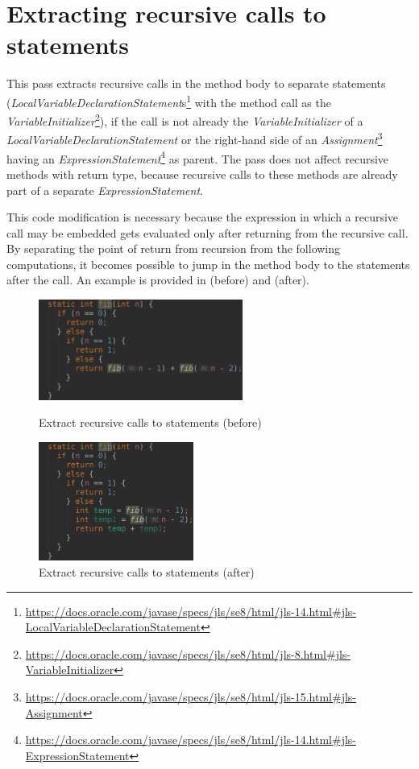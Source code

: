 \section{Extracting recursive calls to statements}

This pass extracts recursive calls in the method body to separate statements
(\textit{LocalVariableDeclarationStatement}s\footnote{\url{https://docs.oracle.com/javase/specs/jls/se8/html/jls-14.html#jls-LocalVariableDeclarationStatement}}
with the method call as the
\textit{VariableInitializer}\footnote{\url{https://docs.oracle.com/javase/specs/jls/se8/html/jls-8.html#jls-VariableInitializer}}),
if the call is not already the \textit{VariableInitializer} of a \textit{LocalVariableDeclarationStatement} or the
right-hand side of an \textit{Assignment}\footnote{\url{https://docs.oracle.com/javase/specs/jls/se8/html/jls-15.html#jls-Assignment}}
having an \textit{ExpressionStatement}\footnote{\url{https://docs.oracle.com/javase/specs/jls/se8/html/jls-14.html#jls-ExpressionStatement}}
as parent. The pass does not affect recursive methods with  return type, because recursive calls to these
methods are already part of a separate \textit{ExpressionStatement}.

This code modification is necessary because the expression in which a recursive call may be embedded gets evaluated
only after returning from the recursive call. By separating the point of return from recursion from the following
computations, it becomes possible to jump in the method body to the statements after the call. An example is provided
in  (before) and  (after).

\begin{figure}[htb]
    \centering
    \begin{minipage}[b]{0.45\textwidth}
        \centering
        \includegraphics[height=1.3in]{src/img/extract-before.png}
        \caption{Extract recursive calls to \mbox{statements} (before) \label{img:extract-before}}
    \end{minipage}
    \hfill
    \begin{minipage}[b]{0.45\textwidth}
        \centering
        \includegraphics[height=1.536in]{src/img/extract-after.png}
        \caption{Extract recursive calls to statements (after) \label{img:extract-after}}
    \end{minipage}
\end{figure}